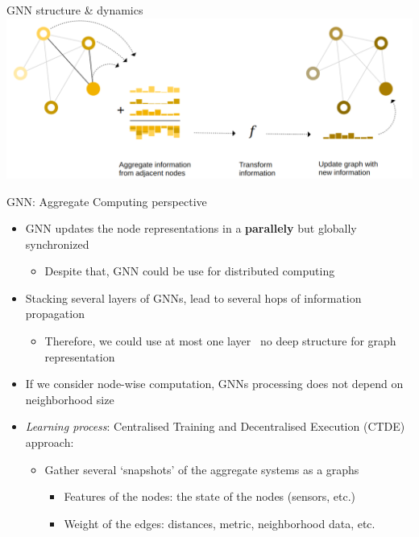 \documentclass[presentation, 9pt]{beamer}\mode<presentation>{\usetheme{AMSBolognaFC}}
\begin{document}
\begin{frame}[fragile]{GNN structure \& dynamics}
	\centering
	\includegraphics[width=\textwidth]{img/example-gnn.png}

\end{frame}
\begin{frame}{GNN: Aggregate Computing perspective}
	\begin{itemize}
			\item GNN updates the node representations in a \textbf{parallely} {\textcolor{darkcyan}\faThumbsUp} but globally synchronized {\textcolor{bolognafcred}\faThumbsDown}
			\begin{itemize}
				\item Despite that, GNN could be use for distributed computing {\textcolor{darkcyan}\faThumbsUp}
			\end{itemize} 
			\item Stacking several layers of GNNs, lead to several hops of information propagation
			\begin{itemize}
				\item Therefore, we could use at most one layer \faArrowRight \, no deep structure for graph representation
			\end{itemize}
			\item If we consider node-wise computation, GNNs processing does not depend on neighborhood size {\textcolor{darkcyan}\faThumbsUp}
			\item \emph{Learning process}: Centralised Training and Decentralised Execution (CTDE) approach:
			\begin{itemize}
				\item Gather several `snapshots' of the aggregate systems as a graphs
				\begin{itemize}
					\item Features of the nodes: the state of the nodes (sensors, etc.)
					\item Weight of the edges: distances, metric, neighborhood data, etc.
				\end{itemize}

\end{itemize}
\end{itemize}
\end{frame}
\end{document}
